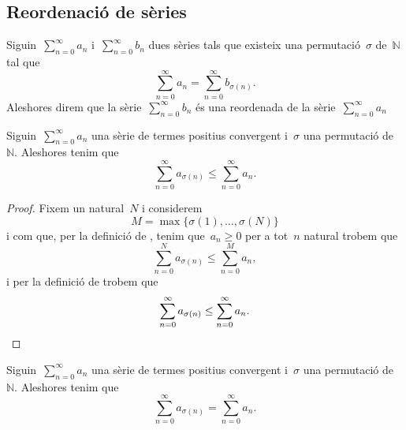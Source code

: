 \documentclass[../../main.tex]{subfiles}
\begin{document}
    \subsection{Reordenació de sèries}
    \begin{definition}
        \label{def:reordenada d'una sèrie}
        Siguin~\(\sum_{n=0}^{\infty}a_{n}\) i~\(\sum_{n=0}^{\infty}b_{n}\) dues sèries tals que existeix una permutació~\(\sigma\) de~\(\mathbb{N}\) tal que
        \[
            \sum_{n=0}^{\infty}a_{n}=\sum_{n=0}^{\infty}b_{\sigma(n)}.
        \]
        Aleshores direm que la sèrie~\(\sum_{n=0}^{\infty}b_{n}\) és una reordenada de la sèrie~\(\sum_{n=0}^{\infty}a_{n}\)
    \end{definition}
    \begin{lemma}
        \label{lema:la reordenada d'una sèrie de termes positius convergent és més petita que la sèrie}
        Siguin~\(\sum_{n=0}^{\infty}a_{n}\) una sèrie de termes positius convergent i~\(\sigma\) una permutació de~\(\mathbb{N}\).
        Aleshores tenim que
        \[
            \sum_{n=0}^{\infty}a_{\sigma(n)}\leq\sum_{n=0}^{\infty}a_{n}.
        \]
        \begin{proof}
            Fixem un natural~\(N\) i considerem
            \[
                M=\max\{\sigma(1),\dots,\sigma(N)\}
            \]
            i com que, per la definició de , tenim que~\(a_{n}\geq0\) per a tot~\(n\) natural trobem que
            \[
                \sum_{n=0}^{N}a_{\sigma(n)}\leq\sum_{n=0}^{M}a_{n},
            \]
            i per la definició de  trobem que
            \[
                \sum_{n=0}^{\infty}a_{\sigma(n)}\leq\sum_{n=0}^{\infty}a_{n}.\qedhere
            \]
        \end{proof}
    \end{lemma}
    \begin{corollary}
        \label{cor:la reordenada d'una sèrie de termes positius convergent conserva la sèrie}
        Siguin~\(\sum_{n=0}^{\infty}a_{n}\) una sèrie de termes positius convergent i~\(\sigma\) una permutació de~\(\mathbb{N}\).
        Aleshores tenim que
        \[
            \sum_{n=0}^{\infty}a_{\sigma(n)}=\sum_{n=0}^{\infty}a_{n}.
        \]
    \end{corollary}
\end{document}
